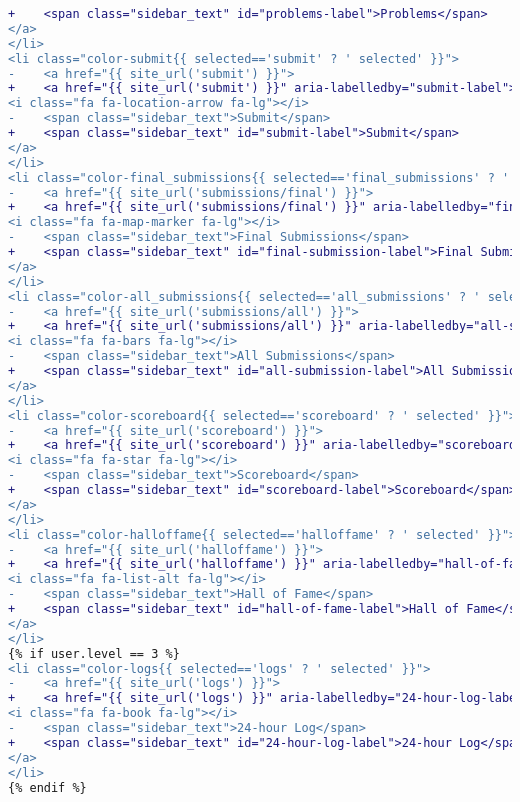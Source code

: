 \begin{itemize}
\begin{lstlisting}[language=diff, caption=Perubahan untuk mematuhi kriteria 2.4.4, label=lst_2.4.4, basicstyle=\ttfamily, frame=single,
columns=fullflexible, keepspaces=true, breaklines=true]
+    <span class="sidebar_text" id="problems-label">Problems</span>
</a>
</li>
<li class="color-submit{{ selected=='submit' ? ' selected' }}">
-    <a href="{{ site_url('submit') }}">
+    <a href="{{ site_url('submit') }}" aria-labelledby="submit-label">
<i class="fa fa-location-arrow fa-lg"></i>
-    <span class="sidebar_text">Submit</span>
+    <span class="sidebar_text" id="submit-label">Submit</span>
</a>
</li>
<li class="color-final_submissions{{ selected=='final_submissions' ? ' selected' }}">
-    <a href="{{ site_url('submissions/final') }}">
+    <a href="{{ site_url('submissions/final') }}" aria-labelledby="final-submission-label">
<i class="fa fa-map-marker fa-lg"></i>
-    <span class="sidebar_text">Final Submissions</span>
+    <span class="sidebar_text" id="final-submission-label">Final Submissions</span>
</a>
</li>
<li class="color-all_submissions{{ selected=='all_submissions' ? ' selected' }}">
-    <a href="{{ site_url('submissions/all') }}">
+    <a href="{{ site_url('submissions/all') }}" aria-labelledby="all-submission-label">
<i class="fa fa-bars fa-lg"></i>
-    <span class="sidebar_text">All Submissions</span>
+    <span class="sidebar_text" id="all-submission-label">All Submissions</span>
</a>
</li>
<li class="color-scoreboard{{ selected=='scoreboard' ? ' selected' }}">
-    <a href="{{ site_url('scoreboard') }}">
+    <a href="{{ site_url('scoreboard') }}" aria-labelledby="scoreboard-label">
<i class="fa fa-star fa-lg"></i>
-    <span class="sidebar_text">Scoreboard</span>
+    <span class="sidebar_text" id="scoreboard-label">Scoreboard</span>
</a>
</li>
<li class="color-halloffame{{ selected=='halloffame' ? ' selected' }}">
-    <a href="{{ site_url('halloffame') }}">
+    <a href="{{ site_url('halloffame') }}" aria-labelledby="hall-of-fame-label">
<i class="fa fa-list-alt fa-lg"></i>
-    <span class="sidebar_text">Hall of Fame</span>
+    <span class="sidebar_text" id="hall-of-fame-label">Hall of Fame</span>
</a>
</li>
{% if user.level == 3 %}
<li class="color-logs{{ selected=='logs' ? ' selected' }}">
-    <a href="{{ site_url('logs') }}">
+    <a href="{{ site_url('logs') }}" aria-labelledby="24-hour-log-label">
<i class="fa fa-book fa-lg"></i>
-    <span class="sidebar_text">24-hour Log</span>
+    <span class="sidebar_text" id="24-hour-log-label">24-hour Log</span>
</a>
</li>
{% endif %}


\end{lstlisting}
\end{itemize}
